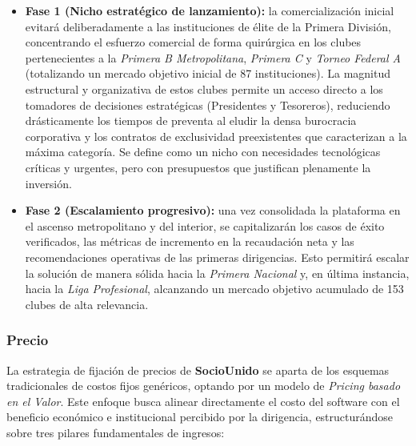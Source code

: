 \begin{itemize}
    \item \textbf{Fase 1 (Nicho estratégico de lanzamiento):} la comercialización inicial evitará deliberadamente a las instituciones de élite de la Primera División, concentrando el esfuerzo comercial de forma quirúrgica en los clubes pertenecientes a la \textit{Primera B Metropolitana}, \textit{Primera C} y \textit{Torneo Federal A} (totalizando un mercado objetivo inicial de 87 instituciones). La magnitud estructural y organizativa de estos clubes permite un acceso directo a los tomadores de decisiones estratégicas (Presidentes y Tesoreros), reduciendo drásticamente los tiempos de preventa al eludir la densa burocracia corporativa y los contratos de exclusividad preexistentes que caracterizan a la máxima categoría. Se define como un nicho con necesidades tecnológicas críticas y urgentes, pero con presupuestos que justifican plenamente la inversión.
    \item \textbf{Fase 2 (Escalamiento progresivo):} una vez consolidada la plataforma en el ascenso metropolitano y del interior, se capitalizarán los casos de éxito verificados, las métricas de incremento en la recaudación neta y las recomendaciones operativas de las primeras dirigencias. Esto permitirá escalar la solución de manera sólida hacia la \textit{Primera Nacional} y, en última instancia, hacia la \textit{Liga Profesional}, alcanzando un mercado objetivo acumulado de 153 clubes de alta relevancia.
\end{itemize}

\newpage

\subsubsection*{Precio}

La estrategia de fijación de precios de \textbf{SocioUnido} se aparta de los esquemas tradicionales de costos fijos genéricos, optando por un modelo de \textit{Pricing basado en el Valor}. Este enfoque busca alinear directamente el costo del software con el beneficio económico e institucional percibido por la dirigencia, estructurándose sobre tres pilares fundamentales de ingresos:

